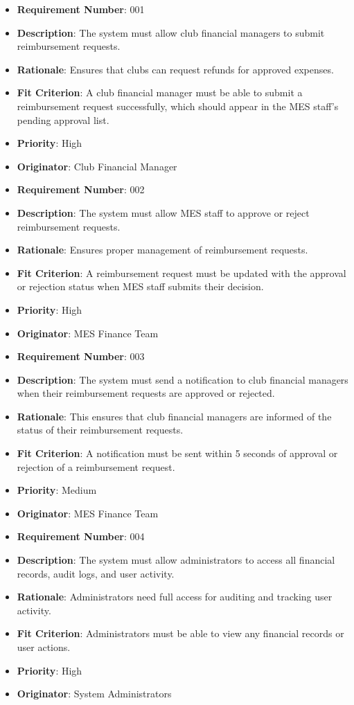 \documentclass[12pt]{article}
\begin{document}
\begin{itemize}

  \item \textbf{Requirement Number}: 001
  \item \textbf{Description}: The system must allow club financial managers to submit reimbursement requests.
  \item \textbf{Rationale}: Ensures that clubs can request refunds for approved expenses.
  \item \textbf{Fit Criterion}: A club financial manager must be able to submit a reimbursement request successfully, which should appear in the MES staff's pending approval list.
  \item \textbf{Priority}: High
  \item \textbf{Originator}: Club Financial Manager
  
  \bigskip

  \item \textbf{Requirement Number}: 002
  \item \textbf{Description}: The system must allow MES staff to approve or reject reimbursement requests.
  \item \textbf{Rationale}: Ensures proper management of reimbursement requests.
  \item \textbf{Fit Criterion}: A reimbursement request must be updated with the approval or rejection status when MES staff submits their decision.
  \item \textbf{Priority}: High
  \item \textbf{Originator}: MES Finance Team

  \bigskip

  \item \textbf{Requirement Number}: 003
  \item \textbf{Description}: The system must send a notification to club financial managers when their reimbursement requests are approved or rejected.
  \item \textbf{Rationale}: This ensures that club financial managers are informed of the status of their reimbursement requests.
  \item \textbf{Fit Criterion}: A notification must be sent within 5 seconds of approval or rejection of a reimbursement request.
  \item \textbf{Priority}: Medium
  \item \textbf{Originator}: MES Finance Team

  \bigskip

  \item \textbf{Requirement Number}: 004
  \item \textbf{Description}: The system must allow administrators to access all financial records, audit logs, and user activity.
  \item \textbf{Rationale}: Administrators need full access for auditing and tracking user activity.
  \item \textbf{Fit Criterion}: Administrators must be able to view any financial records or user actions.
  \item \textbf{Priority}: High
  \item \textbf{Originator}: System Administrators
  

\end{itemize}
\end{document}
